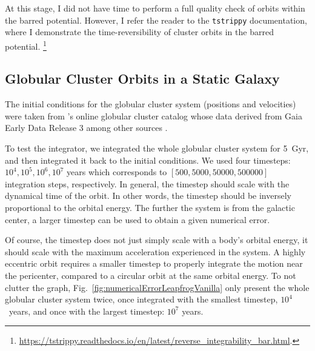     At this stage, I did not have time to perform a full quality check of orbits within the barred potential. However, I refer the reader to the \texttt{tstrippy} documentation, where I demonstrate the time-reversibility of cluster orbits in the barred potential. \footnote{\url{https://tstrippy.readthedocs.io/en/latest/reverse_integrability_bar.html}.}
    



    \subsection{Globular Cluster Orbits in a Static Galaxy}
        The initial conditions for the globular cluster system (positions and velocities) were taken from \citet{2018MNRAS.478.1520B}'s online globular cluster catalog whose data derived from Gaia Early Data Release 3 among other sources \citep{2021MNRAS.505.5957B,2021A&A...649A...1G,2021MNRAS.505.5978V,2023A&A...674A...1G}.

        To test the integrator, we integrated the whole globular cluster system for 5~Gyr, and then integrated it back to the initial conditions. We used four timesteps: $10^4,10^5,10^6,10^7$ years which corresponds to $\left[500,5000,50000,500000\right]$ integration steps, respectively. In general, the timestep should scale with the dynamical time of the orbit. In other words, the timestep should be inversely proportional to the orbital energy. The further the system is from the galactic center, a larger timestep can be used to obtain a given numerical error. 
        
        Of course, the timestep does not just simply scale with a body's orbital energy, it should scale with the maximum acceleration experienced in the system. A highly eccentric orbit requires a smaller timestep to properly integrate the motion near the pericenter, compared to a circular orbit at the same orbital energy. To not clutter the graph, Fig.~\ref{fig:numericalErrorLeapfrogVanilla} only present the whole globular cluster system twice, once integrated with the smallest timestep, $10^4$~years, and once with the largest timestep: $10^7$ years.

